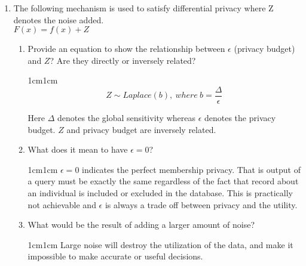 \documentclass[11pt,letterpaper]{article}
\newenvironment{answer}{\em \color{blue} \begin{adjustwidth}{1cm}{1cm}}{\end{adjustwidth}}
\begin{document}
\begin{enumerate}
\begin{answer}
\begin{itemize}
			\end{itemize}
		\end{answer}
		
		\item The following mechanism is used to satisfy differential privacy where Z denotes the noise added.\\
		\centering
		$F(x) = f(x) + Z $\\
		
		\vspace{0.25cm}
		\begin{enumerate}
			\item Provide an equation to show the relationship between $\epsilon$ (privacy budget) and $Z$? Are they directly or inversely related?
			\begin{answer}
				\[
					Z \sim Laplace\left( b \right), ~ where ~ b =\frac{\Delta}{\epsilon}
				\]
				
				Here $\Delta$ denotes the global sensitivity whereas $\epsilon$ denotes the privacy budget. $Z$ and privacy budget are inversely related.
			\end{answer}
			
			\item What does it mean to have $\epsilon = 0$?
			\begin{answer}
				$\epsilon = 0$ indicates the perfect membership privacy. That is output of a query must be exactly the same regardless of the fact that record about an individual is included or excluded in the database. This is practically not achievable and $\epsilon$ is always a trade off between privacy and the utility.
			\end{answer}
			
			\item What would be the result of adding a larger amount of noise?
			\begin{answer}
				Large noise will destroy the utilization of the data, and make it impossible to make accurate or useful decisions.
			\end{answer}
		\end{enumerate}
		
	\end{enumerate}
	
\end{document}
